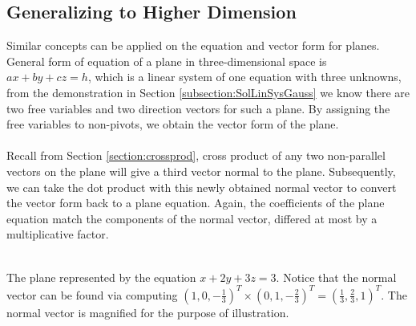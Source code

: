 \subsection{Generalizing to Higher Dimension}
\label{section:vecgeohighdim}
Similar concepts can be applied on the equation and vector form for planes. General form of equation of a plane in three-dimensional space is $ax + by + cz = h$, which is a linear system of one equation with three unknowns, from the demonstration in Section \ref{subsection:SolLinSysGauss} we know there are two free variables and two direction vectors for such a plane. By assigning the free variables to non-pivots, we obtain the vector form of the plane. \\
\\
Recall from Section \ref{section:crossprod}, cross product of any two non-parallel vectors on the plane will give a third vector normal to the plane. Subsequently, we can take the dot product with this newly obtained normal vector to convert the vector form back to a plane equation. Again, the coefficients of the plane equation match the components of the normal vector, differed at most by a multiplicative factor.
\begin{center}
 \\
The plane represented by the equation $x + 2y + 3z = 3$. Notice that the normal vector can be found via computing $(1, 0, -\frac{1}{3})^T \times (0, 1, -\frac{2}{3})^T = (\frac{1}{3}, \frac{2}{3}, 1)^T$. The normal vector is magnified for the purpose of illustration.
\end{center}

